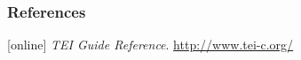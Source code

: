 \begin{frame}
    \frametitle{References}
    \addtocounter{nframe}{1}
    \begin{thebibliography}{10}
        
        [online]
        \tiny{} \textit{TEI Guide Reference}. \url{http://www.tei-c.org/}

    \end{thebibliography}

\end{frame}